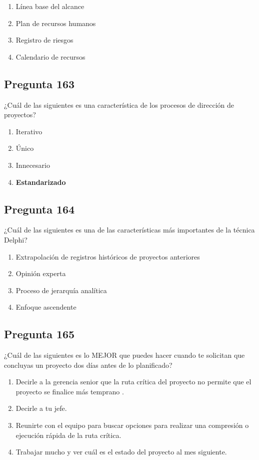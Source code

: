 \documentclass[11pt,a4paper]{article}
\begin{document}
\begin{enumerate}[label=\alph*)]
  \item Línea base del alcance
  \item Plan de recursos humanos
  \item Registro de riesgos
  \item Calendario de recursos
\end{enumerate}

\subsection*{Pregunta 163}
¿Cuál de las siguientes es una característica de los procesos de dirección de proyectos?

\begin{enumerate}[label=\alph*)]
  \item Iterativo
  \item Único
  \item Innecesario
  \item \textbf{Estandarizado}
\end{enumerate}

\subsection*{Pregunta 164}
¿Cuál de las siguientes es una de las características más importantes de la técnica Delphi?

\begin{enumerate}[label=\alph*)]
  \item Extrapolación de registros históricos de proyectos anteriores
  \item Opinión experta
  \item Proceso de jerarquía analítica
  \item Enfoque ascendente
\end{enumerate}

\subsection*{Pregunta 165}
¿Cuál de las siguientes es lo MEJOR que puedes hacer cuando te solicitan que concluyas un proyecto dos días antes de lo planificado?

\begin{enumerate}[label=\alph*)]
  \item Decirle a la gerencia senior que la ruta crítica del proyecto no permite que el proyecto se finalice más temprano .
  \item Decirle a tu jefe.
  \item Reunirte con el equipo para buscar opciones para realizar una compresión o ejecución rápida de la ruta crítica.
  \item Trabajar mucho y ver cuál es el estado del proyecto al mes siguiente.
\end{enumerate}
\end{document}
